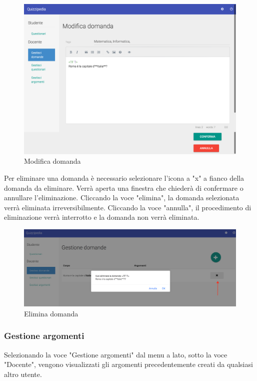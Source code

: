 \documentclass[12pt,a4paper]{article}
\begin{document}
		\begin{figure}[H]	
			\centering
			\includegraphics[width=0.8\linewidth]{../img/screenshot/modificaDomanda.png}
			\caption{Modifica domanda}
			\label{Modifica domanda}
		\end{figure}
	
	
	\par Per eliminare una domanda è necessario selezionare l'icona a "x" a fianco della domanda da eliminare.
	Verrà aperta una finestra che chiederà di confermare o annullare l'eliminazione. Cliccando la voce "elimina", la domanda selezionata verrà eliminata irreversibilmente. Cliccando la voce "annulla", il procedimento di eliminazione verrà interrotto e la domanda non verrà eliminata. \\
	
	\begin{figure}[H]	
		\centering
		\includegraphics[width=1.0\linewidth]{../img/screenshot/eliminaDomanda.png}
		\caption{Elimina domanda}
		\label{Elimina domanda}
	\end{figure}
		
	\subsubsection{Gestione argomenti}
	\par Selezionando la voce "Gestione argomenti" dal menu a lato, sotto la voce "Docente", vengono visualizzati gli argomenti precedentemente creati da qualsiasi altro utente.
	
\end{document}
